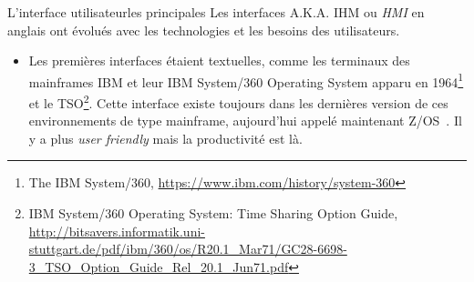 \documentclass{beamer}
\begin{document}
    \begin{frame}{L'interface utilisateur}{les principales}
        Les interfaces A.K.A. IHM ou \textit{HMI} en anglais ont évolués avec les technologies et les besoins des utilisateurs.
        \begin{itemize}
            \item Les premières interfaces étaient textuelles, comme les terminaux des mainframes IBM et leur IBM System/360 Operating System apparu en 1964\footnote{The IBM System/360, \url{https://www.ibm.com/history/system-360}} et le TSO\footnote{IBM System/360 Operating System: Time Sharing Option Guide, \url{http://bitsavers.informatik.uni-stuttgart.de/pdf/ibm/360/os/R20.1_Mar71/GC28-6698-3_TSO_Option_Guide_Rel_20.1_Jun71.pdf}}.
            Cette interface existe toujours dans les dernières version de ces environnements de type mainframe, aujourd'hui appelé maintenant Z/OS~.
            Il y a plus \textit{user friendly} mais la productivité est là.
        \end{itemize}
    \end{frame}
\end{document}
